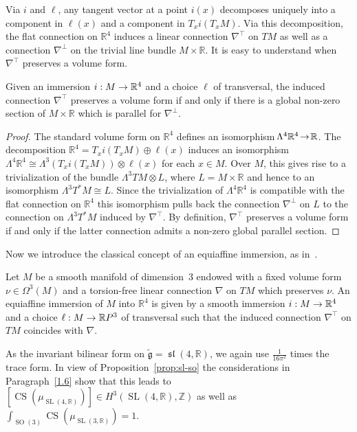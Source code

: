 \documentclass[AHL,Unicode,longabstracts]{cedram}
\newcommand{\x}{\times}
\newcommand{\La}{\Lambda}
\newcommand{\Om}{\Omega}
\DeclareMathOperator{\CS}{CS}
\DeclareMathOperator{\SO}{SO}
\DeclareMathOperator{\SL}{SL}
\DeclareMathOperator{\fksl}{\mathfrak{sl}}
\newcommand*{\R}{\mathbb{R}}
\newcommand{\Z}{\mathbb{Z}}
\newcommand{\tfg}{\widetilde{\mathfrak g}}
\renewcommand*{\to}{\mathchoice{\longrightarrow}{\rightarrow}{\rightarrow}{\rightarrow}}
\newcommand*{\R}{\mathbb{R}}
\begin{document}
Via $i$ and $\ell$, any tangent vector at a point $i(x)$ decomposes uniquely into a component in $\ell(x)$ and a component in $T_xi(T_xM)$. Via this decomposition, the flat connection on $\R^4$ induces a linear connection $\nabla^\top$ on $TM$ as well as a connection $\nabla^\perp$ on the trivial line bundle $M\x\R$. It is easy to understand when $\nabla^\top$ preserves a volume form.

\begin{lemm}\label{lemma:volume}
Given an immersion $i: M\to\R^4$ and a choice $\ell$ of transversal, the induced connection $\nabla^\top$ preserves a volume form if and only if there is a global non-zero section of $M\x\R$ which is parallel for $\nabla^\perp$.
\end{lemm}

\begin{proof}
The standard volume form on $\R^4$ defines an isomorphism $\!\Lambda^4\R^4\!\to\!\R$. The decomposition $\R^4\!=\!T_xi(T_xM)\!\oplus\!\ell(x)$ induces an isomorphism $\Lambda^4\R^4\!\cong\! \Lambda^3(T_xi(T_xM))\otimes\ell(x)$ for each $x\in M$. Over $M$, this gives rise to a trivialization of the bundle $\La^3TM\otimes L$, where $L=M\x\R$ and hence to an isomorphism $\La^3T^*M\cong L$. Since the trivialization of $\La^4\R^4$ is compatible with the flat connection on $\R^4$ this isomorphism pulls back the connection $\nabla^\perp$ on $L$ to the connection on $\La^3T^*M$ induced by $\nabla^\top$. By definition, $\nabla^\top$ preserves a volume form if and only if the latter connection admits a non-zero global parallel section.
\end{proof}

Now we introduce the classical concept of an equiaffine immersion, as in~\cite[Definition~1.4]{MR1311248}.

\begin{defi}\label{def:equiaffine}
Let $M$ be a smooth manifold of dimension~$3$ endowed with a fixed volume form $\nu\in\Om^3(M)$ and a torsion-free linear connection $\nabla$ on $TM$ which preserves $\nu$. An equiaffine immersion of $M$ into $\R^4$ is given by a smooth immersion $i: M\to\R^4$ and a choice $\ell: M\to\R P^3$ of transversal such that the induced connection $\nabla^\top$ on $TM$ coincides with $\nabla$.
\end{defi}

As the invariant bilinear form on $\tfg=\fksl(4,\R)$, we again use $\frac{1}{16\pi^2}$ times the trace form. In view of Proposition~\ref{prop:sl-so} the considerations in Paragraph~\ref{1.6} show that this leads to $[\CS(\mu_{\SL(4,\R)})]\in H^3(\SL(4,\R),\Z)$ as well as $\int_{\SO(3)}\CS(\mu_{\SL(3,\R)})=1$.
\end{document}
